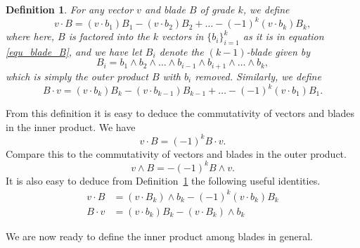 \documentclass[12pt]{article}
\numberwithin{equation}{section}
\newtheorem{definition}{Definition}[section]
\begin{document}
\begin{definition}\label{def_vec_blade_inner_prod}
For any vector $v$ and blade $B$ of grade $k$, we define
\begin{equation}\label{equ_v_dot_B_expanded}
v\cdot B = (v\cdot b_1)B_1 - (v\cdot b_2)B_2 + \dots - (-1)^k(v\cdot b_k)B_k,
\end{equation}
where here, $B$ is factored into the $k$ vectors in $\{b_i\}_{i=1}^k$ as it
is in equation \eqref{equ_blade_B}, and we have let $B_i$ denote the $(k-1)$-blade
given by
\begin{equation}
B_i = b_1\wedge b_2\wedge\dots\wedge b_{i-1}\wedge b_{i+1}\wedge\dots\wedge b_k,
\end{equation}
which is simply the outer product $B$ with $b_i$ removed.  Similarly, we define
\begin{equation}
B\cdot v = (v\cdot b_k)B_k - (v\cdot b_{k-1})B_{k-1} +\dots - (-1)^k(v\cdot b_1)B_1.
\end{equation}
\end{definition}
From this definition it is easy to deduce the commutativity of vectors and
blades in the inner product.  We have
\begin{equation}
v\cdot B = (-1)^k B\cdot v.
\end{equation}
Compare this to the commutativity of vectors and blades in the outer product.
\begin{equation}
v\wedge B = -(-1)^k B\wedge v.
\end{equation}
It is also easy to deduce from Definition~\ref{def_vec_blade_inner_prod} the
following useful identities.
\begin{align}
v\cdot B &= (v\cdot B_k)\wedge b_k-(-1)^k(v\cdot b_k)B_k\label{equ_v_dot_B_recursive_ident} \\
B\cdot v &= (v\cdot b_k)B_k - (v\cdot B_k)\wedge b_k
\end{align}

We are now ready to define the inner product among blades
in general.
\end{document}
